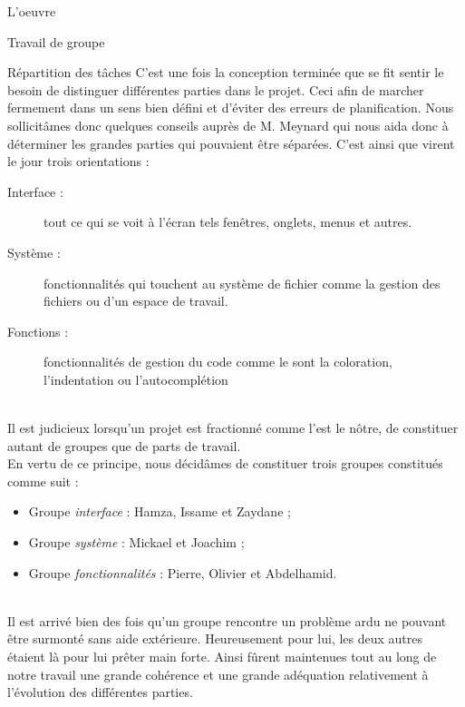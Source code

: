 \documentclass[a4paper, 12pt]{report}
\begin{document}
	\begin{part}{L'oeuvre}
		\begin{chapter}{Travail de groupe}
			\begin{section}{Répartition des tâches}
				C'est une fois la conception terminée que se fit sentir le besoin de distinguer différentes parties dans le projet. Ceci afin de
				marcher fermement dans un sens bien défini et d'éviter des erreurs de planification.
				Nous sollicitâmes donc quelques conseils auprès de M. Meynard qui nous aida donc à déterminer les grandes parties qui pouvaient 
				être séparées. C'est ainsi que virent le jour trois orientations :\\
				\begin{description}
					\item[Interface :] tout ce qui se voit à l'écran tels fenêtres, onglets, menus et autres.
					\item[Système :] fonctionnalités qui touchent au système de fichier comme la gestion des fichiers ou d'un espace de travail.
					\item[Fonctions :] fonctionnalités de gestion du code comme le sont la coloration, l'indentation ou l'\gls{autocomplétion}
				\end{description}~\\


				Il est judicieux lorsqu'un projet est fractionné comme l'est le nôtre, de constituer autant de groupes que de parts de travail.\\
				En vertu de ce principe, nous décidâmes de constituer trois groupes constitués comme suit :\\

				\begin{itemize}
					\item Groupe \emph{interface} : Hamza, Issame et Zaydane ;
					\item Groupe \emph{système} : Mickael et Joachim ;
					\item Groupe \emph{fonctionnalités} : Pierre, Olivier et Abdelhamid.
				\end{itemize}~\\

				Il est arrivé bien des fois qu'un groupe rencontre un problème ardu ne pouvant être surmonté sans aide extérieure.
				Heureusement pour lui, les deux autres étaient là pour lui prêter main forte. Ainsi fûrent maintenues tout au long de notre travail
				une grande cohérence et une grande adéquation relativement à l'évolution des différentes parties.\\



\end{section}
\end{chapter}
\end{part}
\end{document}
